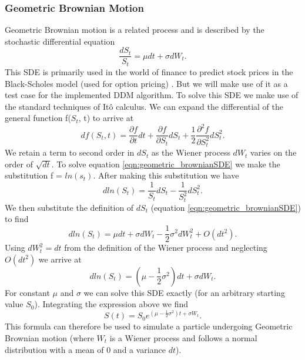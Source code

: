 \documentclass[11pt]{article}
\begin{document}
\subsubsection{Geometric Brownian Motion}
Geometric Brownian motion is a related process and is described by the stochastic differential equation 
\begin{equation}
\label{eqn:geometric_brownianSDE}
\frac{dS_t}{S_t} = \mu dt + \sigma dW_t.
\end{equation}
This SDE is primarily used in the world of finance to predict stock prices in the Black-Scholes model (used for option pricing) \cite{sde}. But we will make use of it as a test case for the implemented DDM algorithm. To solve this SDE we make use of the standard techniques of Itô calculus. We can expand the differential of the general function f($S_t$, t) to arrive at
\begin{equation}
df(S_t, t) = \frac{\partial f}{\partial t} dt + \frac{\partial f}{\partial S_t} dS_t + \frac{1}{2} \frac{\partial^2 f}{\partial S_t^2} dS_t^2.
\end{equation}
We retain a term to second order in $dS_t$ as the Wiener process $dW_t$ varies on the order of $\sqrt{dt}$. To solve equation \ref{eqn:geometric_brownianSDE} we make the substitution f = $ln(s_t)$. After making this substitution we have
\begin{equation}
dln(S_t) = \frac{1}{S_t}dS_t  - \frac{1}{S_t^2}dS_t^2.
\end{equation}
We then substitute the definition of $dS_t$ (equation \ref{eqn:geometric_brownianSDE}) to find
\begin{equation}
dln(S_t) = \mu dt + \sigma dW_t - \frac{1}{2} \sigma^2 dW_t^2 + O(dt^2).
\end{equation}
Using $dW_t^2 = dt$ from the definition of the Wiener process and neglecting $O(dt^2)$ we arrive at
\begin{equation}
dln(S_t) = (\mu - \frac{1}{2} \sigma^2) dt + \sigma dW_t.
\end{equation}
For constant $\mu$ and $\sigma$ we can solve this SDE exactly (for an arbitrary starting value $S_0$). Integrating the expression above we find
\begin{equation}
\label{eqn:geometric_brownian_equation}
S(t) = S_0 e^{(\mu - \frac{1}{2} \sigma^2) t + \sigma W_t}.
\end{equation}
This formula can therefore be used to simulate a particle undergoing Geometric Brownian motion (where $W_t$ is a Wiener process and follows a normal distribution with a mean of 0 and a variance $dt$).
\end{document}

